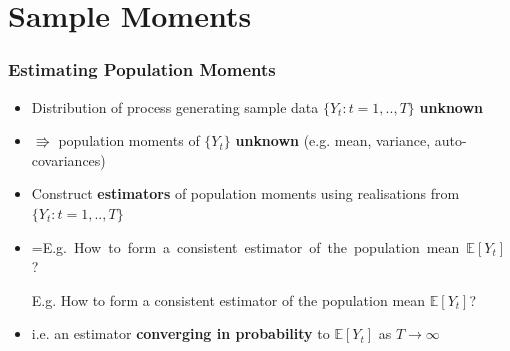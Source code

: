 \documentclass{beamer}
\makeatletter
\newcommand{\mybox}[1]{%
	\setbox0=\hbox{#1}%
	\setlength{\@tempdima}{\dimexpr\wd0+13pt}%
	\begin{tcolorbox}[colframe=ikb, colback=aliceblue ,boxrule=0.5pt,arc=4pt,
		left=6pt,right=6pt,top=6pt,bottom=6pt,boxsep=0pt,width=\@tempdima]
		#1
	\end{tcolorbox}
}
\makeatother
\begin{document}
	
	\section{Sample Moments}
	\begin{frame}
		\frametitle{Estimating Population Moments}
		\begin{itemize}
			
			\item[] Distribution of process generating sample data $\{Y_t: t=1,..,T\}$	  \textbf{unknown}
			\vspace{10pt}
			\pause 
			\item[] \hspace{12pt} $\Rrightarrow$ population moments of  $\{Y_t\}$ \textbf{unknown} (e.g. mean, variance, auto-covariances)
			\vspace{15pt}
			\pause 
			\item[] Construct \textbf{estimators} of population moments using realisations from $\{Y_t: t=1,..,T\}$
			\vspace{20pt}
			\pause 
			\item[] \mybox{E.g. How to form a consistent estimator of the population mean $\mathbb{E}[Y_t]$?}
				\vspace{15pt}
			\pause 
			\item[] i.e. an estimator \textbf{converging in probability} to  $\mathbb{E}[Y_t]$ as $T\rightarrow \infty$
	
			
			
		\end{itemize}
	\end{frame}
	
\end{document}
